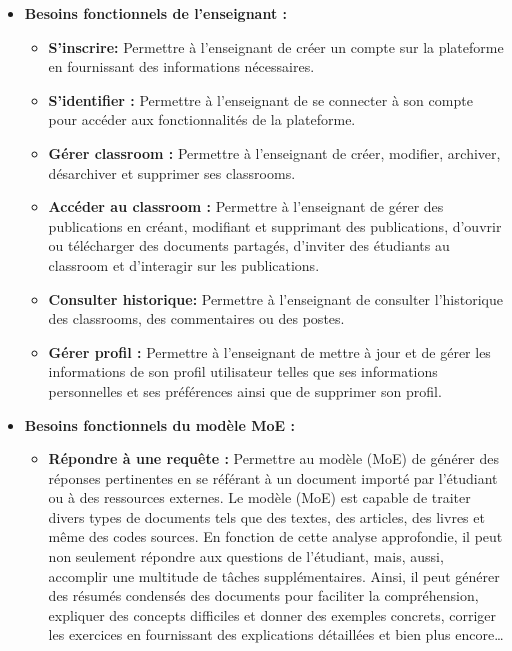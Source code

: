 \begin{itemize}[itemsep=2pt, parsep=2pt]
\begin{itemize}[itemsep=1pt, parsep=1pt]
    \end{itemize}
    \item \textbf{Besoins fonctionnels de l'enseignant :}
    \begin{itemize}[itemsep=1pt, parsep=1pt]
        \item \textbf{S'inscrire: }Permettre à l'enseignant de créer un compte sur la plateforme en fournissant des informations nécessaires.
        \item \textbf{S'identifier : }Permettre à l'enseignant de se connecter à son compte pour accéder aux fonctionnalités de la plateforme.
        \item \textbf{Gérer classroom : }Permettre à l'enseignant de créer, modifier, archiver, désarchiver et supprimer ses classrooms.
        \item \textbf{Accéder au classroom : } Permettre à l'enseignant de gérer des publications en créant, modifiant et supprimant des publications, d'ouvrir ou télécharger des documents partagés, d'inviter des étudiants au classroom et d'interagir sur les publications.
        \item \textbf{Consulter historique: } Permettre à l’enseignant de consulter l’historique des classrooms, des commentaires ou des postes.
        \item \textbf{Gérer profil :  } Permettre à l'enseignant de mettre à jour et de gérer les informations de son profil utilisateur telles que ses informations personnelles et ses préférences ainsi que de supprimer son profil.
    \end{itemize}
    \item \textbf{Besoins fonctionnels du modèle MoE :}
    \begin{itemize}[itemsep=1pt, parsep=1pt]
        \item \textbf{Répondre à une requête : } Permettre au modèle (MoE) de générer des réponses pertinentes en se référant à un document importé par l'étudiant ou à des ressources externes. Le modèle (MoE) est capable de traiter divers types de documents tels que des textes, des articles, des livres et même des codes sources. En fonction de cette analyse approfondie, il peut non seulement répondre aux questions de l'étudiant, mais, aussi, accomplir une multitude de tâches supplémentaires. Ainsi, il peut générer des résumés condensés des documents pour faciliter la compréhension, expliquer des concepts difficiles et donner des exemples concrets, corriger les exercices en fournissant des explications détaillées et bien plus encore…
    \end{itemize}

\end{itemize}


